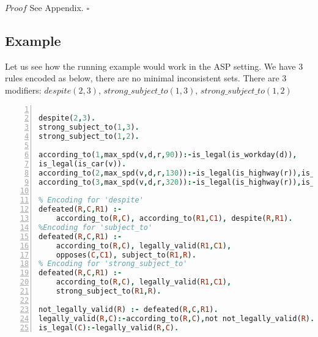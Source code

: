 $Proof$ See Appendix. $\square$


\subsection{Example}
Let us see how the running example would work in the ASP setting. We have 3 rules encoded as below, there are no minimal inconsistent sets. There are 3 modifiers: $despite(2,3)$,                           $strong\_subject\_to(1,3)$, $strong\_subject\_to(1,2)$
\begin{lstlisting}[language=Prolog, numbers=left]

despite(2,3).
strong_subject_to(1,3).
strong_subject_to(1,2).

according_to(1,max_spd(v,d,r,90)):-is_legal(is_workday(d)),
is_legal(is_car(v)).
according_to(2,max_spd(v,d,r,130)):-is_legal(is_highway(r)),is_legal(is_car(v)).
according_to(3,max_spd(v,d,r,320)):-is_legal(is_highway(r)),is_legal(is_sports_car(v)).

% Encoding for 'despite'
defeated(R,C,R1) :-
    according_to(R,C), according_to(R1,C1), despite(R,R1).
%Encoding for 'subject_to'
defeated(R,C,R1) :-
    according_to(R,C), legally_valid(R1,C1),
    opposes(C,C1), subject_to(R1,R).
% Encoding for 'strong_subject_to'
defeated(R,C,R1) :-
    according_to(R,C), legally_valid(R1,C1),
    strong_subject_to(R1,R).

not_legally_valid(R) :- defeated(R,C,R1).
legally_valid(R,C):-according_to(R,C),not not_legally_valid(R).
is_legal(C):-legally_valid(R,C).
\end{lstlisting}

